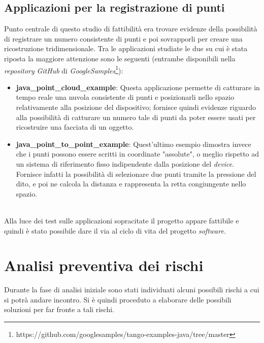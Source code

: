 \subsection{Applicazioni per la registrazione di punti}
Punto centrale di questo studio di fattibilità era trovare evidenze della possibilità di registrare un numero consistente di punti e poi sovrapporli per creare una ricostruzione tridimensionale.
Tra le applicazioni studiate le due su cui è stata riposta la maggiore attenzione sono le seguenti (entrambe disponibili nella \emph{repository} \emph{GitHub} di \emph{GoogleSamples}\footnote{https://github.com/googlesamples/tango-examples-java/tree/master}):
\begin{itemize}
	\item \textbf{java\_point\_cloud\_example}: Questa applicazione permette di catturare in tempo reale una nuvola consistente di punti e posizionarli nello spazio relativamente alla posizione del dispositivo; fornisce quindi evidenze riguardo alla possibilità di catturare un numero tale di punti da poter essere usati per ricostruire una facciata di un oggetto.
	\item \textbf{java\_point\_to\_point\_example}: Quest'ultimo esempio dimostra invece che i punti possono essere scritti in coordinate "assolute", o meglio rispetto ad un sistema di riferimento fisso indipendente dalla posizione del \emph{device}. Fornisce infatti la possibilità di selezionare due punti tramite la pressione del dito, e poi ne calcola la distanza e rappresenta la retta congiungente nello spazio.
\end{itemize}
\ \\
Alla luce dei test sulle applicazioni sopracitate il progetto appare fattibile e quindi è stato possibile dare il via al ciclo di vita del progetto \emph{software}.


\section{Analisi preventiva dei rischi}

Durante la fase di analisi iniziale sono stati individuati alcuni possibili rischi a cui si potrà andare incontro.
Si è quindi proceduto a elaborare delle possibili soluzioni per far fronte a tali rischi.\\

